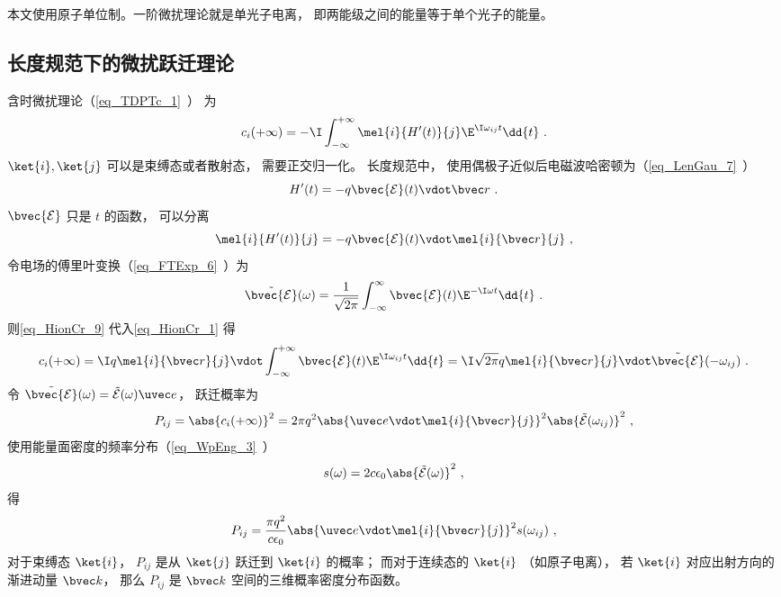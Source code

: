 

本文使用原子单位制。一阶微扰理论就是单光子电离， 即两能级之间的能量等于单个光子的能量。

\subsection{长度规范下的微扰跃迁理论}
含时微扰理论（\autoref{eq_TDPTc_1}~） 为
\begin{equation}\label{eq_HionCr_1}
c_i(+\infty) = -\I \int_{-\infty}^{+\infty} \mel{i}{H'(t)}{j} \E^{\I\omega_{ij} t} \dd{t}~.
\end{equation}
$\ket{i},\ket{j}$ 可以是束缚态或者散射态， 需要正交归一化。 长度规范中， 使用偶极子近似后电磁波哈密顿为（\autoref{eq_LenGau_7}~）
\begin{equation}
H'(t) = -q\bvec {\mathcal E}(t) \vdot \bvec r~.
\end{equation}
$\bvec {\mathcal E}$ 只是 $t$ 的函数， 可以分离
\begin{equation}\label{eq_HionCr_9}
\mel{i}{H'(t)}{j} = -q\bvec {\mathcal E}(t) \vdot \mel{i}{\bvec r}{j}~,
\end{equation}
令电场的傅里叶变换（\autoref{eq_FTExp_6}~）为
\begin{equation}
\tilde {\bvec {\mathcal E}}(\omega) = \frac{1}{\sqrt{2\pi}} \int_{-\infty}^{\infty} \bvec {\mathcal E}(t) \E^{-\I\omega t} \dd{t}~.
\end{equation}
则\autoref{eq_HionCr_9} 代入\autoref{eq_HionCr_1} 得
\begin{equation}\label{eq_HionCr_7}
c_i(+\infty) = \I q \mel{i}{\bvec r}{j} \vdot \int_{-\infty}^{+\infty} \bvec {\mathcal E}(t) \E^{\I\omega_{ij} t} \dd{t} = \I \sqrt{2\pi} q \mel{i}{\bvec r}{j} \vdot \tilde {\bvec {\mathcal E}}(-\omega_{ij})~.
\end{equation}
令 $\tilde {\bvec {\mathcal E}}(\omega) = \tilde {{\mathcal E}}(\omega)\uvec e$， 跃迁概率为
\begin{equation}\label{eq_HionCr_2}
P_{ij} = \abs{c_i(+\infty)}^2 = 2\pi q^2 \abs{\uvec e \vdot \mel{i}{\bvec r}{j}}^2 \abs{\tilde {{\mathcal E}}(\omega_{ij})}^2~,
\end{equation}
使用能量面密度的频率分布（\autoref{eq_WpEng_3}~）
\begin{equation}\label{eq_HionCr_8}
s(\omega) = 2c\epsilon_0 \abs{\tilde {{\mathcal E}}(\omega)}^2~,
\end{equation}
得
\begin{equation}\label{eq_HionCr_6}
P_{ij} = \frac{\pi q^2}{c\epsilon_0} \abs{\uvec e \vdot\mel{i}{\bvec r}{j}}^2 s(\omega_{ij})~,
\end{equation}
对于束缚态 $\ket{i}$， $P_{ij}$ 是从 $\ket{j}$ 跃迁到 $\ket{i}$ 的概率； 而对于连续态的 $\ket{i}$ （如原子电离）， 若 $\ket{i}$ 对应出射方向的渐进动量 $\bvec k$， 那么 $P_{ij}$ 是 $\bvec k$ 空间的三维概率密度分布函数。

